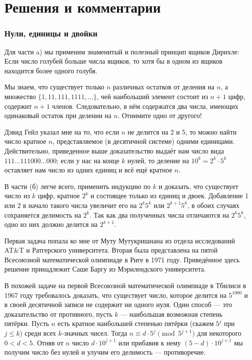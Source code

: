 \section*{Решения и комментарии}

\subsubsection*{Нули, единицы и двойки}%


Для части a) мы применим знаменитый и полезный принцип ящиков Дирихле:
Если число голубей больше числа ящиков, то хотя бы в одном из ящиков находится более одного голубя.

Мы знаем, что существует только $n$ различных остатков от деления на $n$, а множество  $\{1, 11, 111, 1111,\dots\}$, чей наибольший элемент
состоит из $n+1$ цифр,  содержит $n+1$ членов.
Следовательно, в нём содержатся два числа, имеющих одинаковый остаток при делении на $n$. 
Отнимите одно от другого!
\heart

Дэвид Гейл %
указал мне на то, %
что если $n$ не  делится на 2 и 5, то можно найти число кратное $n$, представляемое (в десятичной системе) одними единицами. 
Действительно, приведенное выше доказательство выдаёт нам число  вида $111\dots111000\dots000$; 
если у нас на конце $k$ нулей, то деление на $10^k=2^k\cdot 5^k$ оставляет нам число из одних единиц и всё ещё кратное $n$.


В части (б) легче всего, применить индукцию по $k$
и доказать, что существует число из $k$ цифр, кратное $2^k$ и состоящее только из единиц и двоек.
Добавление 1 или 2 в начало такого числа увеличит его на $2^k5^k$ или $2^{k+1}5^k$, в обоих случаях сохраняется делимость на $2^k$. 
Так как два полученных числа отличаются на $2^k5^k$, одно из них должно делится на $2^{k+1}$.
\heart

Первая задача попала ко мне от Муту Мутукришнана %
из отдела исследований AT\&T и Ратгерского университета.  
Вторая была представлена на пятой Всесоюзной математической олимпиаде в Риге в 1971 году. 
Приведённое здесь решение принадлежит Саше Баргу %
из Мэрилендского университета.

\medskip

В похожей задаче на первой Всесоюзной математической олимпиаде в Тбилиси в 1967 году требовалось доказать, что существует число, которое делится на $5^{1000}$ и в своей десятичной записи  не содержит ни одного нуля.  
Один способ --- это доказательство от противного,  
пусть $k$ --- наибольшая возможная степень пятёрки.
Пусть $n$ есть кратное наибольшей степенью пятёрки (скажем $5^j$ при $j\le k$)
среди всех $k$-значных чисел.
Тогда $n\equiv d\cdot 5^j\pmod{5^{j+1}}$ для некоторого $0<d<5$.
Отняв от $n$ число $d\cdot 10^{j+1}$ или прибавив к нему $(5-d)\cdot 10^{j+1}$
мы получим число без нулей и улучим его делимость --- противоречие.
\heart

